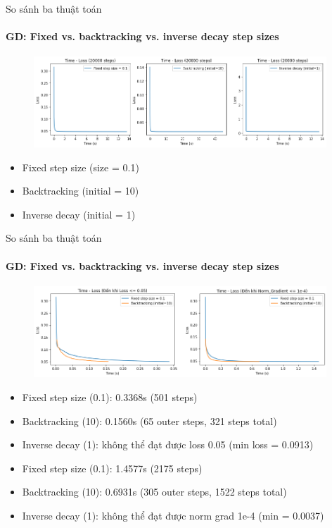 \documentclass[10pt]{beamer}
\theoremstyle{remark}
\theoremstyle{definition}
\begin{document}
\begin{frame}{So sánh ba thuật toán}
	\framesubtitle{GD: Fixed vs. backtracking vs. inverse decay step sizes}

	\begin{figure}[h!]
		\centering
		\includegraphics[width=11cm]{Thinh/10.png}
	\end{figure}

	\begin{itemize}
		\item Fixed step size (size = 0.1)
		\item Backtracking (initial = 10)
		\item Inverse decay (initial = 1)
	\end{itemize}

\end{frame}
\begin{frame}{So sánh ba thuật toán}
	\framesubtitle{GD: Fixed vs. backtracking vs. inverse decay step sizes}

	\begin{figure}[h!]
		\centering
		\includegraphics[width=11cm]{Thinh/11.png}
	\end{figure}

	\begin{small}
	\begin{multicols}{2}
	\begin{itemize}
		\item Fixed step size (0.1): 0.3368s (501 steps) 
		\item Backtracking (10): 0.1560s (65 outer steps, 321 steps total)
		\item Inverse decay (1): không thể đạt được loss 0.05 (min loss = 0.0913)
		\item Fixed step size (0.1): 1.4577s (2175 steps)
		\item Backtracking (10): 0.6931s (305 outer steps, 1522 steps total)
		\item Inverse decay (1): không thể đạt được norm grad 1e-4 (min = 0.0037)
	\end{itemize}
	\end{multicols}
	\end{small}
	
\end{frame}
\end{document}
